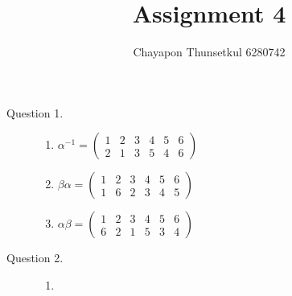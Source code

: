 \documentclass[]{article}
\title{Assignment 4}
\author{Chayapon Thunsetkul 6280742}
\begin{document}
\maketitle
\begin{description}
    \item[Question 1.] \begin{enumerate}
        \item $\alpha^{-1} = \begin{pmatrix}
            1&2&3&4&5&6\\
            2&1&3&5&4&6
        \end{pmatrix}$
        \item $\beta \alpha = \begin{pmatrix}
            1&2&3&4&5&6\\
            1&6&2&3&4&5
        \end{pmatrix}$
        \item $\alpha \beta = \begin{pmatrix}
            1&2&3&4&5&6\\
            6&2&1&5&3&4
        \end{pmatrix}$
    \end{enumerate}
    \item[Question 2.] \begin{enumerate}
        \item 
    \end{enumerate}
\end{description}
\end{document}
